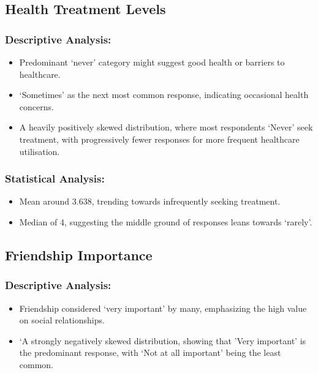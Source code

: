 \documentclass[
]{article}
\providecommand{\tightlist}{%
  \setlength{\itemsep}{0pt}\setlength{\parskip}{0pt}}
\begin{document}
\hypertarget{health-treatment-levels}{%
\subsection{Health Treatment Levels}\label{health-treatment-levels}}

\hypertarget{descriptive-analysis-4}{%
\subsubsection{Descriptive Analysis:}\label{descriptive-analysis-4}}

\begin{itemize}
\tightlist
\item
  Predominant `never' category might suggest good health or barriers to
  healthcare.
\item
  `Sometimes' as the next most common response, indicating occasional
  health concerns.
\item
  A heavily positively skewed distribution, where most respondents
  `Never' seek treatment, with progressively fewer responses for more
  frequent healthcare utilisation.
\end{itemize}

\hypertarget{statistical-analysis-4}{%
\subsubsection{Statistical Analysis:}\label{statistical-analysis-4}}

\begin{itemize}
\tightlist
\item
  Mean around 3.638, trending towards infrequently seeking treatment.
\item
  Median of 4, suggesting the middle ground of responses leans towards
  `rarely'.
\end{itemize}

\hypertarget{friendship-importance}{%
\subsection{Friendship Importance}\label{friendship-importance}}

\hypertarget{descriptive-analysis-5}{%
\subsubsection{Descriptive Analysis:}\label{descriptive-analysis-5}}

\begin{itemize}
\tightlist
\item
  Friendship considered `very important' by many, emphasizing the high
  value on social relationships.
\item
  `A strongly negatively skewed distribution, showing that 'Very
  important' is the predominant response, with `Not at all important'
  being the least common.
\end{itemize}
\end{document}
